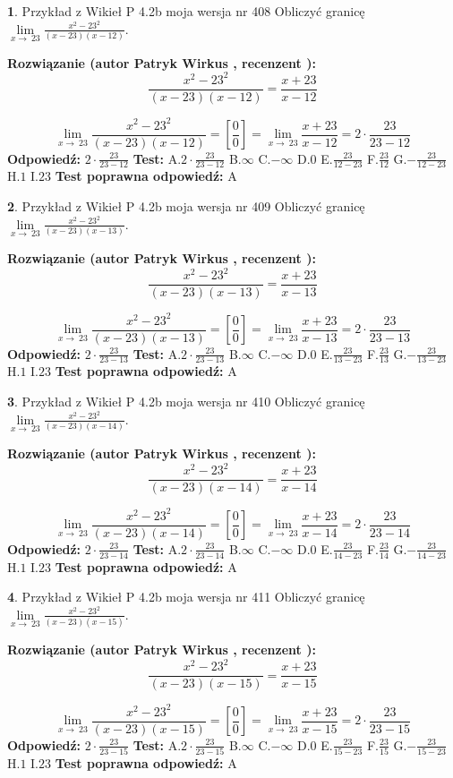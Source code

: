 \documentclass[12pt, a4paper]{article}
\theoremstyle{definition} %
\newtheorem{zad}{}
\newcommand{\zadStart}[1]{\begin{zad}#1\newline}
\newcommand{\zadStop}{\end{zad}}
\newcommand{\rozwStart}[2]{\noindent \textbf{Rozwiązanie (autor #1 , recenzent #2): }\newline}
\newcommand{\rozwStop}{\newline}
\newcommand{\odpStart}{\noindent \textbf{Odpowiedź:}\newline}
\newcommand{\odpStop}{\newline}
\newcommand{\testStart}{\noindent \textbf{Test:}\newline}
\newcommand{\testStop}{\newline}
\newcommand{\kluczStart}{\noindent \textbf{Test poprawna odpowiedź:}\newline}
\newcommand{\kluczStop}{\newline}
\begin{document}
\zadStart{Przykład z Wikieł P 4.2b moja wersja nr 408}
Obliczyć granicę $\lim\limits_{x\to\ 23}\frac{x^{2}-23^{2}}{(x-23)(x-12)}$.
\zadStop
\rozwStart{Patryk Wirkus}{}
$$\frac{x^{2}-23^{2}}{(x-23)(x-12)}=\frac{x+23}{x-12}$$

$$\lim\limits_{x\to\ 23}\frac{x^{2}-23^{2}}{(x-23)(x-12)}=[\frac{0}{0}]=\lim\limits_{x\to\ 23}\frac{x+23}{x-12}=2 \cdot \frac{23}{23-12}$$
\rozwStop
\odpStart
$2 \cdot \frac{23}{23-12}$
\odpStop
\testStart
A.$2 \cdot \frac{23}{23-12}$
B.$\infty$
C.$-\infty$
D.$0$
E.$\frac{23}{12-23}$
F.$\frac{23}{12}$
G.$-\frac{23}{12-23}$
H.$1$
I.$23$
\testStop
\kluczStart
A
\kluczStop



\zadStart{Przykład z Wikieł P 4.2b moja wersja nr 409}
Obliczyć granicę $\lim\limits_{x\to\ 23}\frac{x^{2}-23^{2}}{(x-23)(x-13)}$.
\zadStop
\rozwStart{Patryk Wirkus}{}
$$\frac{x^{2}-23^{2}}{(x-23)(x-13)}=\frac{x+23}{x-13}$$

$$\lim\limits_{x\to\ 23}\frac{x^{2}-23^{2}}{(x-23)(x-13)}=[\frac{0}{0}]=\lim\limits_{x\to\ 23}\frac{x+23}{x-13}=2 \cdot \frac{23}{23-13}$$
\rozwStop
\odpStart
$2 \cdot \frac{23}{23-13}$
\odpStop
\testStart
A.$2 \cdot \frac{23}{23-13}$
B.$\infty$
C.$-\infty$
D.$0$
E.$\frac{23}{13-23}$
F.$\frac{23}{13}$
G.$-\frac{23}{13-23}$
H.$1$
I.$23$
\testStop
\kluczStart
A
\kluczStop



\zadStart{Przykład z Wikieł P 4.2b moja wersja nr 410}
Obliczyć granicę $\lim\limits_{x\to\ 23}\frac{x^{2}-23^{2}}{(x-23)(x-14)}$.
\zadStop
\rozwStart{Patryk Wirkus}{}
$$\frac{x^{2}-23^{2}}{(x-23)(x-14)}=\frac{x+23}{x-14}$$

$$\lim\limits_{x\to\ 23}\frac{x^{2}-23^{2}}{(x-23)(x-14)}=[\frac{0}{0}]=\lim\limits_{x\to\ 23}\frac{x+23}{x-14}=2 \cdot \frac{23}{23-14}$$
\rozwStop
\odpStart
$2 \cdot \frac{23}{23-14}$
\odpStop
\testStart
A.$2 \cdot \frac{23}{23-14}$
B.$\infty$
C.$-\infty$
D.$0$
E.$\frac{23}{14-23}$
F.$\frac{23}{14}$
G.$-\frac{23}{14-23}$
H.$1$
I.$23$
\testStop
\kluczStart
A
\kluczStop



\zadStart{Przykład z Wikieł P 4.2b moja wersja nr 411}
Obliczyć granicę $\lim\limits_{x\to\ 23}\frac{x^{2}-23^{2}}{(x-23)(x-15)}$.
\zadStop
\rozwStart{Patryk Wirkus}{}
$$\frac{x^{2}-23^{2}}{(x-23)(x-15)}=\frac{x+23}{x-15}$$

$$\lim\limits_{x\to\ 23}\frac{x^{2}-23^{2}}{(x-23)(x-15)}=[\frac{0}{0}]=\lim\limits_{x\to\ 23}\frac{x+23}{x-15}=2 \cdot \frac{23}{23-15}$$
\rozwStop
\odpStart
$2 \cdot \frac{23}{23-15}$
\odpStop
\testStart
A.$2 \cdot \frac{23}{23-15}$
B.$\infty$
C.$-\infty$
D.$0$
E.$\frac{23}{15-23}$
F.$\frac{23}{15}$
G.$-\frac{23}{15-23}$
H.$1$
I.$23$
\testStop
\kluczStart
A
\kluczStop
\end{document}

